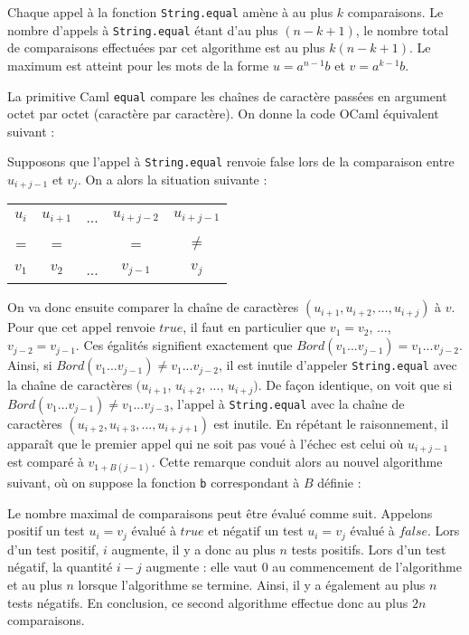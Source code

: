

Chaque appel à la fonction \texttt{String.equal} amène à au plus $k$ comparaisons. Le nombre d'appels à \texttt{String.equal} étant d'au plus $(n-k+1)$, le nombre total de comparaisons effectuées par cet algorithme est au plus $k(n-k+1)$. Le maximum est atteint pour les mots de la forme $u=a^{n-1}b$ et $v=a^{k-1}b$.

\Q
La primitive Caml \texttt{equal} compare les chaînes de caractère passées en argument octet par octet (caractère par caractère). On donne la code OCaml équivalent suivant :



Supposons que l'appel à \texttt{String.equal} renvoie false lors de la comparaison entre $u_{i+j-1}$ et $v_j$. On a alors la situation suivante :
\begin{center}
    \begin{tabular}{ c c c c c }
        $u_i$ & $u_{i+1}$ & ... & $u_{i+j-2}$ & $u_{i+j-1}$ \\
        = & = & & = & $\neq$ \\
        $v_1$ & $v_2$ & ... & $v_{j-1}$ & $v_{j}$
    \end{tabular}
\end{center}

On va donc ensuite comparer la chaîne de caractères $(u_{i+1}, u_{i+2}, ..., u_{i+j})$ à $v$. Pour que cet appel renvoie $true$, il faut en particulier que $v_1=v_2$, ..., $v_{j-2}=v_{j-1}$. Ces égalités signifient exactement que $Bord(v_1...v_{j-1})=v_1...v_{j-2}$. Ainsi, si $Bord(v_1...v_{j-1}) \neq v_1...v_{j-2}$, il est inutile d'appeler \texttt{String.equal} avec la chaîne de caractères $(u_{i+1}$, $u_{i+2}$, ..., $u_{i+j})$. De façon identique, on voit que si $Bord(v_1...v_{j-1}) \neq v_1...v_{j-3}$, l'appel à \texttt{String.equal} avec la chaîne de caractères $(u_{i+2}, u_{i+3}, ..., u_{i+j+1})$ est inutile. En répétant le raisonnement, il apparaît que le premier appel qui ne soit pas voué à l'échec est celui où $u_{i+j-1}$ est comparé à $v_{1+B(j-1)}$. Cette remarque conduit alors au nouvel algorithme suivant, où on suppose la fonction \texttt{b} correspondant à $B$ définie :



Le nombre maximal de comparaisons peut être évalué comme suit. Appelons \og positif \fg{} un test $u_i=v_j$ évalué à $true$ et négatif un test $u_i=v_j$ évalué à $false$. Lors d'un test positif, $i$ augmente, il y a donc au plus $n$ tests positifs. Lors d'un test négatif, la quantité $i-j$ augmente : elle vaut 0 au commencement de l'algorithme et au plus $n$ lorsque l'algorithme se termine. Ainsi, il y a également au plus $n$ tests négatifs. En conclusion, ce second algorithme effectue donc au plus $2n$ comparaisons.

